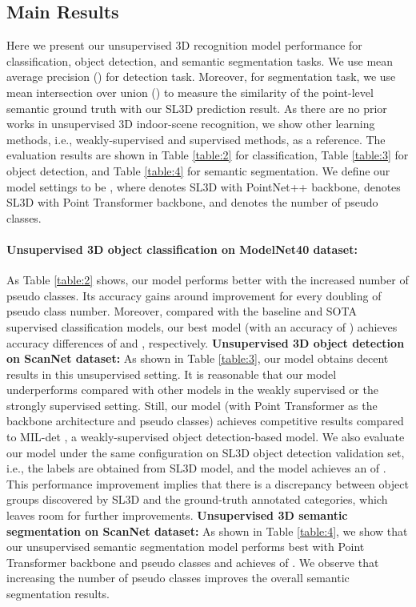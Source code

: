 \documentclass{article}
\begin{document}
\setlength{\parskip}{0.0em}

\subsection{Main Results}

Here we present our unsupervised 3D recognition model performance for classification, object detection, and semantic segmentation tasks. We use mean average precision () for detection task. Moreover, for segmentation task, we use mean intersection over union () to measure the similarity of the point-level semantic ground truth with our SL3D prediction result. 
As there are no prior works in unsupervised 3D indoor-scene recognition, we show other learning methods, i.e., weakly-supervised and supervised methods, as a reference. The evaluation results are shown in Table \ref{table:2} for classification, Table \ref{table:3} for object detection, and Table \ref{table:4} for semantic segmentation. We define our model settings to be , where  denotes SL3D with PointNet++ backbone,  denotes SL3D with Point Transformer backbone, and  denotes the number of pseudo classes.
\setlength{\parskip}{0.0em}

\paragraph{Unsupervised 3D object classification on ModelNet40 dataset:}As Table \ref{table:2} shows, our model performs better with the increased number of pseudo classes. Its accuracy gains around   improvement for every doubling of pseudo class number. Moreover, compared with the baseline and SOTA supervised classification models, our best model (with an accuracy of ) achieves accuracy differences of  and , respectively.\textbf{ Unsupervised 3D object detection on ScanNet dataset: } As shown in Table \ref{table:3}, our model obtains decent results in this unsupervised setting. It is reasonable that our model underperforms compared with other models in the weakly supervised or the strongly supervised setting.
Still, our model (with Point Transformer as the backbone architecture and  pseudo classes) achieves competitive results compared to MIL-det \cite{ren2021wypr}, a weakly-supervised object detection-based model. We also evaluate our model under the same configuration on SL3D object detection validation set, i.e., the labels are obtained from SL3D model, and the model achieves an \hbox{} of . 
This performance improvement implies that there is a discrepancy between object groups discovered by SL3D and the ground-truth annotated categories, which leaves room for further improvements. \textbf{ Unsupervised 3D semantic segmentation on ScanNet dataset: } As shown in Table \ref{table:4}, we show that our unsupervised semantic segmentation model performs best with Point Transformer backbone and  pseudo classes and achieves  of . We observe that increasing the number of pseudo classes improves the overall semantic segmentation results.
\end{document}

